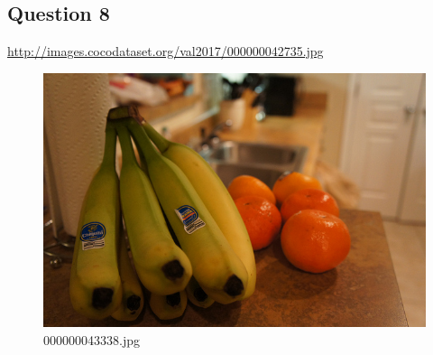 \subsection*{Question 8}
\url{http://images.cocodataset.org/val2017/000000042735.jpg}
    \begin{figure}[h]
        \centering
        \includegraphics[width=0.8\linewidth]{../image set/easy/000000043338.jpg}
        \caption{000000043338.jpg}
    \end{figure}
